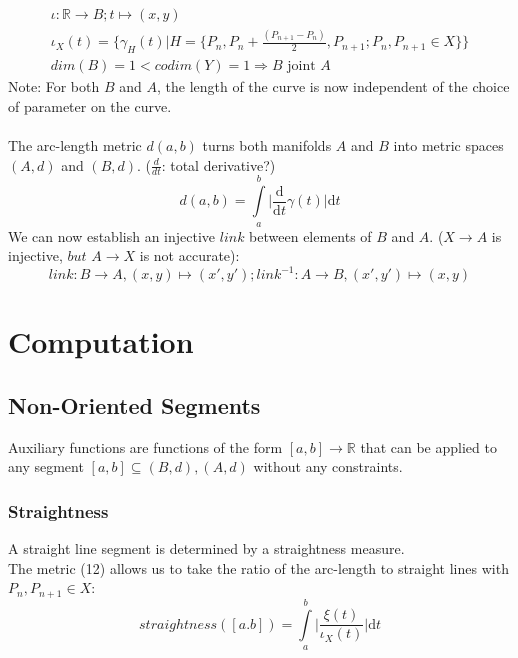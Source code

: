 \documentclass{article}
\begin{document}
\begin{align}
\iota: \mathbb{R} \rightarrow B; t \mapsto (x,y)\\
\iota_{X}(t) = \{ \gamma_{H}(t)\lvert H=\{P_{n},P_{n}+\frac{(P_{n+1}-P_{n})}{2},P_{n+1}; P_{n}, P_{n+1} \in X\}\}\\
dim(B)=1<codim(Y)=1 \Rightarrow B \text{ joint } A
\end{align}
Note: For both $B$ and $A$, the length of the curve is now independent of the choice of parameter on the curve. ~\cite[]{Taimanov}\\\\
The arc-length metric $d(a,b)$ turns both manifolds $A$ and $B$ into metric spaces $(A,d)$ and $(B,d)$. ($\frac{d}{dt}$: total derivative?)
\begin{equation}
d(a,b) = \int \limits _{a}^{b}\lvert \frac{\mathrm{d}}{\mathrm{d}t}\gamma(t)\rvert \mathrm{d}t
\end{equation}
We can now establish an injective $link$ between elements of $B$ and $A$. ($X \rightarrow A$ is injective, $but$ $A \rightarrow X$ is not accurate):
\begin{equation}
link: B \rightarrow A, (x,y) \mapsto (x',y'); link^{-1}: A \rightarrow B, (x',y') \mapsto (x,y)
\end{equation}
\section{Computation}

\subsection{Non-Oriented Segments}

Auxiliary functions are functions of the form $[a,b] \rightarrow \mathbb{R}$ that can be applied to any segment $[a,b] \subseteq (B,d),(A,d)$ without any constraints.

\subsubsection{Straightness}
A straight line segment is determined by a straightness measure.\\
The metric (12) allows us to take the ratio of the arc-length to straight lines with $P_{n},P_{n+1} \in X$:
\begin{equation}
straightness([a.b])=\int \limits _{a}^{b}\lvert \frac{\xi(t)}{\iota_{X}(t)}\rvert \mathrm{d}t
\end{equation}
\iffalse
\end{document}
